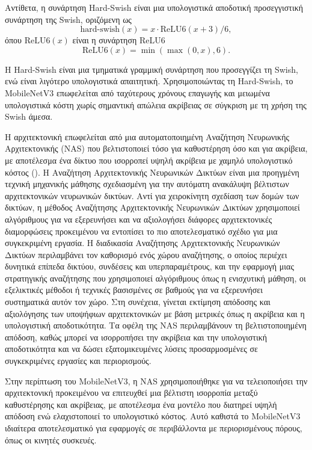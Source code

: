 Αντίθετα, η συνάρτηση Hard-Swish είναι μια υπολογιστικά αποδοτική προσεγγιστική συνάρτηση της Swish, οριζόμενη ως
\[
\text{hard-swish}(x) = x \cdot \text{ReLU6}(x + 3) / 6,
\]
όπου \(\text{ReLU6}(x)\) είναι η συνάρτηση ReLU6
\[
\text{ReLU6}(x) = \min(\max(0, x), 6).
\]

Η Hard-Swish είναι μια τμηματικά γραμμική συνάρτηση που προσεγγίζει τη Swish, ενώ είναι λιγότερο υπολογιστικά απαιτητική. Χρησιμοποιώντας τη Hard-Swish, το MobileNetV3 επωφελείται από ταχύτερους χρόνους επαγωγής και μειωμένα υπολογιστικά κόστη χωρίς σημαντική απώλεια ακρίβειας σε σύγκριση με τη χρήση της Swish άμεσα.

Η αρχιτεκτονική επωφελείται από μια αυτοματοποιημένη Αναζήτηση Νευρωνικής Αρχιτεκτονικής (NAS) που βελτιστοποιεί τόσο για καθυστέρηση όσο και για ακρίβεια, με αποτέλεσμα ένα δίκτυο που ισορροπεί υψηλή ακρίβεια με χαμηλό υπολογιστικό κόστος (). Η Αναζήτηση Αρχιτεκτονικής Νευρωνικών Δικτύων είναι μια προηγμένη τεχνική μηχανικής μάθησης σχεδιασμένη για την αυτόματη ανακάλυψη βέλτιστων αρχιτεκτονικών νευρωνικών δικτύων. Αντί για χειροκίνητη σχεδίαση των δομών των δικτύων, η μέθοδος Αναζήτησης Αρχιτεκτονικής Νευρωνικών Δικτύων χρησιμοποιεί αλγόριθμους για να εξερευνήσει και να αξιολογήσει διάφορες αρχιτεκτονικές διαμορφώσεις προκειμένου να εντοπίσει το πιο αποτελεσματικό σχέδιο για μια συγκεκριμένη εργασία. Η διαδικασία Αναζήτησης Αρχιτεκτονικής Νευρωνικών Δικτύων περιλαμβάνει τον καθορισμό ενός χώρου αναζήτησης, ο οποίος περιέχει δυνητικά επίπεδα δικτύου, συνδέσεις και υπερπαραμέτρους, και την εφαρμογή μιας στρατηγικής αναζήτησης που χρησιμοποιεί αλγόριθμους όπως η ενισχυτική μάθηση, οι εξελικτικές μέθοδοι ή τεχνικές βασισμένες σε βαθμούς για να εξερευνήσει συστηματικά αυτόν τον χώρο. Στη συνέχεια, γίνεται εκτίμηση απόδοσης και αξιολόγησης των υποψήφιων αρχιτεκτονικών με βάση μετρικές όπως η ακρίβεια και η υπολογιστική αποδοτικότητα. Τα οφέλη της NAS περιλαμβάνουν τη βελτιστοποιημένη απόδοση, καθώς μπορεί να ισορροπήσει την ακρίβεια και την υπολογιστική αποδοτικότητα και να δώσει εξατομικευμένες λύσεις προσαρμοσμένες σε συγκεκριμένες εργασίες και περιορισμούς. 

Στην περίπτωση του MobileNetV3, η NAS χρησιμοποιήθηκε για να τελειοποιήσει την αρχιτεκτονική προκειμένου να επιτευχθεί μια βέλτιστη ισορροπία μεταξύ καθυστέρησης και ακρίβειας, με αποτέλεσμα ένα μοντέλο που διατηρεί υψηλή απόδοση ενώ ελαχιστοποιεί το υπολογιστικό κόστος. Αυτό καθιστά το MobileNetV3 ιδιαίτερα αποτελεσματικό για εφαρμογές σε περιβάλλοντα με περιορισμένους πόρους, όπως οι κινητές συσκευές.

